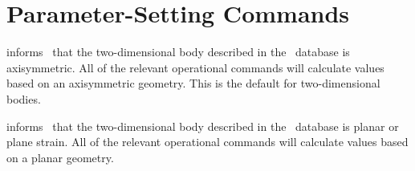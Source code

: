 \section{Parameter-Setting Commands}\label{sec:param}

 {
 informs \numbers\ that the two-dimensional body
described in the \EXO\ database is axisymmetric.  All of the relevant
operational commands will calculate values based on an axisymmetric
geometry.  This is the default for two-dimensional bodies.
}

 {
 informs \numbers\ that the two-dimensional body described
in the \EXO\ database is planar or plane strain. All of the relevant
operational commands will calculate values based on a planar geometry.
}


